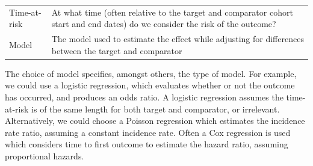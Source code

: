 \documentclass[]{book}
\begin{document}
\begin{longtable}[]{@{}ll@{}}
\begin{minipage}[t]{0.23\columnwidth}\raggedright\strut
Time-at-risk\strut
\end{minipage} & \begin{minipage}[t]{0.71\columnwidth}\raggedright\strut
At what time (often relative to the target and comparator cohort start
and end dates) do we consider the risk of the outcome?\strut
\end{minipage}\tabularnewline
\begin{minipage}[t]{0.23\columnwidth}\raggedright\strut
Model\strut
\end{minipage} & \begin{minipage}[t]{0.71\columnwidth}\raggedright\strut
The model used to estimate the effect while adjusting for differences
between the target and comparator\strut
\end{minipage}\tabularnewline
\bottomrule
\end{longtable}

The choice of model specifies, amongst others, the type of model. For
example, we could use a logistic regression, which evaluates whether or
not the outcome has occurred, and produces an odds ratio. A logistic
regression assumes the time-at-risk is of the same length for both
target and comparator, or irrelevant. Alternatively, we could choose a
Poisson regression which estimates the incidence rate ratio, assuming a
constant incidence rate. Often a Cox regression is used which considers
time to first outcome to estimate the hazard ratio, assuming
proportional hazards.
\end{document}

